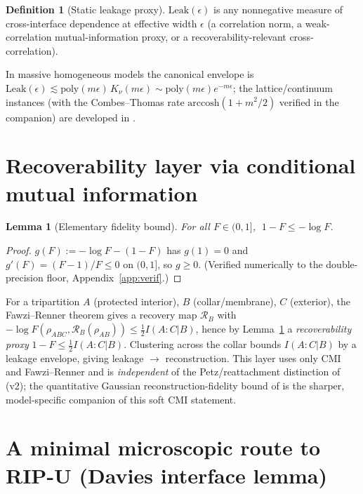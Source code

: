 \documentclass[11pt,a4paper]{article}
\theoremstyle{plain}
\newtheorem{lemma}[theorem]{Lemma}
\theoremstyle{definition}
\newtheorem{definition}[theorem]{Definition}
\theoremstyle{remark}
\newcommand{\eps}{\epsilon}
\begin{document}
\begin{definition}[Static leakage proxy]
$\mathrm{Leak}(\eps)$ is any nonnegative measure of cross-interface
dependence at effective width $\eps$ (a correlation norm, a
weak-correlation mutual-information proxy, or a recoverability-relevant
cross-correlation).
\end{definition}

In massive homogeneous models the canonical envelope is $\mathrm{Leak}(\eps)
\lesssim \mathrm{poly}(m\eps)\, K_\nu(m\eps) \sim \mathrm{poly}(m\eps)
e^{-m\eps}$; the lattice/continuum instances (with the Combes--Thomas rate
$\mathrm{arccosh}(1+m^2/2)$ verified in the companion) are developed in
\cite{Clustering,NIST}.

\section{Recoverability layer via conditional mutual information}

\begin{lemma}[Elementary fidelity bound]\label{lem:fid}
For all $F \in (0,1]$, $\;1 - F \le -\log F$.
\end{lemma}

\begin{proof}
$g(F) := -\log F - (1-F)$ has $g(1) = 0$ and $g'(F) = (F-1)/F \le 0$ on
$(0,1]$, so $g \ge 0$. (Verified numerically to the double-precision floor,
Appendix~\ref{app:verif}.)
\end{proof}

For a tripartition $A$ (protected interior), $B$ (collar/membrane), $C$
(exterior), the Fawzi--Renner theorem \cite{FawziRenner15} gives a recovery
map $\mathcal{R}_B$ with $-\log F(\rho_{ABC}, \mathcal{R}_B(\rho_{AB})) \le
\tfrac12 I(A:C|B)$, hence by Lemma~\ref{lem:fid} a \emph{recoverability proxy}
$1 - F \le \tfrac12 I(A:C|B)$. Clustering across the collar bounds
$I(A:C|B)$ by a leakage envelope, giving leakage $\to$ reconstruction. This
layer uses only CMI and Fawzi--Renner and is \emph{independent} of the
Petz/reattachment distinction of \cite{Clustering} (v2); the quantitative
Gaussian reconstruction-fidelity bound of \cite{Clustering} is the sharper,
model-specific companion of this soft CMI statement.

\section{A minimal microscopic route to RIP-U (Davies interface lemma)}
\label{sec:davies}
\end{document}

